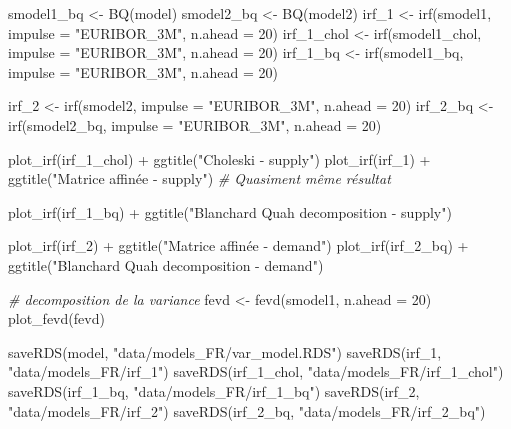 \documentclass[
  10pt,
]{article}
\newenvironment{Shaded}{\begin{snugshade}}{\end{snugshade}}
\newcommand{\AttributeTok}[1]{\textcolor[rgb]{0.77,0.63,0.00}{#1}}
\newcommand{\CommentTok}[1]{\textcolor[rgb]{0.56,0.35,0.01}{\textit{#1}}}
\newcommand{\DecValTok}[1]{\textcolor[rgb]{0.00,0.00,0.81}{#1}}
\newcommand{\FunctionTok}[1]{\textcolor[rgb]{0.00,0.00,0.00}{#1}}
\newcommand{\NormalTok}[1]{#1}
\newcommand{\OtherTok}[1]{\textcolor[rgb]{0.56,0.35,0.01}{#1}}
\newcommand{\SpecialCharTok}[1]{\textcolor[rgb]{0.00,0.00,0.00}{#1}}
\newcommand{\StringTok}[1]{\textcolor[rgb]{0.31,0.60,0.02}{#1}}
\begin{document}
\begin{Shaded}
\begin{Highlighting}[]
\NormalTok{smodel1\_bq }\OtherTok{\textless{}{-}} \FunctionTok{BQ}\NormalTok{(model)}
\NormalTok{smodel2\_bq }\OtherTok{\textless{}{-}} \FunctionTok{BQ}\NormalTok{(model2)}
\NormalTok{irf\_1 }\OtherTok{\textless{}{-}} \FunctionTok{irf}\NormalTok{(smodel1, }\AttributeTok{impulse =} \StringTok{"EURIBOR\_3M"}\NormalTok{,}
           \AttributeTok{n.ahead =} \DecValTok{20}\NormalTok{)}
\NormalTok{irf\_1\_chol }\OtherTok{\textless{}{-}} \FunctionTok{irf}\NormalTok{(smodel1\_chol, }\AttributeTok{impulse =} \StringTok{"EURIBOR\_3M"}\NormalTok{,}
             \AttributeTok{n.ahead =} \DecValTok{20}\NormalTok{)}
\NormalTok{irf\_1\_bq }\OtherTok{\textless{}{-}} \FunctionTok{irf}\NormalTok{(smodel1\_bq, }\AttributeTok{impulse =} \StringTok{"EURIBOR\_3M"}\NormalTok{,}
                  \AttributeTok{n.ahead =} \DecValTok{20}\NormalTok{)}

\NormalTok{irf\_2 }\OtherTok{\textless{}{-}} \FunctionTok{irf}\NormalTok{(smodel2, }\AttributeTok{impulse =} \StringTok{"EURIBOR\_3M"}\NormalTok{,}
             \AttributeTok{n.ahead =} \DecValTok{20}\NormalTok{)}
\NormalTok{irf\_2\_bq }\OtherTok{\textless{}{-}} \FunctionTok{irf}\NormalTok{(smodel2\_bq, }\AttributeTok{impulse =} \StringTok{"EURIBOR\_3M"}\NormalTok{,}
                \AttributeTok{n.ahead =} \DecValTok{20}\NormalTok{)}

\FunctionTok{plot\_irf}\NormalTok{(irf\_1\_chol) }\SpecialCharTok{+} \FunctionTok{ggtitle}\NormalTok{(}\StringTok{"Choleski {-} supply"}\NormalTok{) }
\FunctionTok{plot\_irf}\NormalTok{(irf\_1) }\SpecialCharTok{+} \FunctionTok{ggtitle}\NormalTok{(}\StringTok{"Matrice affinée {-} supply"}\NormalTok{) }\CommentTok{\# Quasiment même résultat}

\FunctionTok{plot\_irf}\NormalTok{(irf\_1\_bq) }\SpecialCharTok{+} \FunctionTok{ggtitle}\NormalTok{(}\StringTok{"Blanchard Quah decomposition {-} supply"}\NormalTok{) }

\FunctionTok{plot\_irf}\NormalTok{(irf\_2) }\SpecialCharTok{+} \FunctionTok{ggtitle}\NormalTok{(}\StringTok{"Matrice affinée {-} demand"}\NormalTok{)}
\FunctionTok{plot\_irf}\NormalTok{(irf\_2\_bq) }\SpecialCharTok{+} \FunctionTok{ggtitle}\NormalTok{(}\StringTok{"Blanchard Quah decomposition {-} demand"}\NormalTok{)}

\CommentTok{\# decomposition de la variance}
\NormalTok{fevd }\OtherTok{\textless{}{-}} \FunctionTok{fevd}\NormalTok{(smodel1, }\AttributeTok{n.ahead =} \DecValTok{20}\NormalTok{)}
\FunctionTok{plot\_fevd}\NormalTok{(fevd)}


\FunctionTok{saveRDS}\NormalTok{(model, }\StringTok{"data/models\_FR/var\_model.RDS"}\NormalTok{)}
\FunctionTok{saveRDS}\NormalTok{(irf\_1, }\StringTok{"data/models\_FR/irf\_1"}\NormalTok{)}
\FunctionTok{saveRDS}\NormalTok{(irf\_1\_chol, }\StringTok{"data/models\_FR/irf\_1\_chol"}\NormalTok{)}
\FunctionTok{saveRDS}\NormalTok{(irf\_1\_bq, }\StringTok{"data/models\_FR/irf\_1\_bq"}\NormalTok{)}
\FunctionTok{saveRDS}\NormalTok{(irf\_2, }\StringTok{"data/models\_FR/irf\_2"}\NormalTok{)}
\FunctionTok{saveRDS}\NormalTok{(irf\_2\_bq, }\StringTok{"data/models\_FR/irf\_2\_bq"}\NormalTok{)}
\end{Highlighting}
\end{Shaded}
\end{document}
